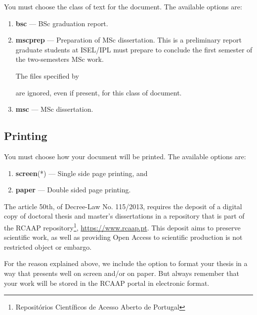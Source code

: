 You must choose the class of text for the document. The available options are:

\begin{enumerate}
	\item \textbf{bsc} --- BSc graduation report.
	\item \textbf{mscprep} --- Preparation of MSc dissertation. This is a preliminary report graduate students at ISEL/IPL must prepare to conclude the first semester of the two-semesters MSc work. 
    
    The files specified by 
	are ignored, even if present, for this class of document.
	\item \textbf{msc} --- MSc dissertation.
\end{enumerate}
%
\subsection{Printing} %
\label{sub:printing}

You must choose how your document will be printed. The available options are:

\begin{enumerate}
\item \textbf{screen}(*) --- Single side page printing, and
\item \textbf{paper} --- Double sided page printing.
\end{enumerate}

The article 50th, of Decree-Law No. 115/2013, requires the deposit of a digital copy of doctoral thesis and master's dissertations in a repository that is part of the RCAAP  repository\footnote{Repositórios Científicos de Acesso Aberto de Portugal}, \url{https://www.rcaap.pt}.  This deposit aims to preserve scientific work, as well as providing Open Access to scientific production is not restricted object or embargo.

For the reason explained above, we include the option to format your thesis in a way that presents well on screen and/or on paper. But always remember that your work will be stored in the RCAAP portal in electronic format.


